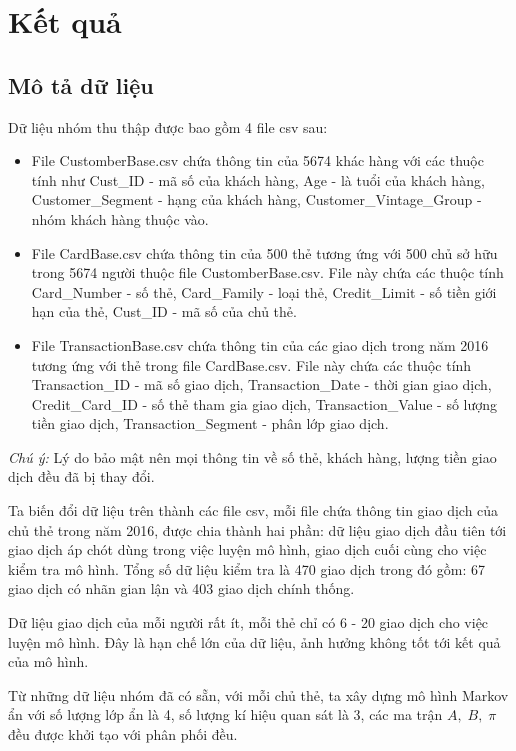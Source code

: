 \setcounter{chapter}{2}
\chapter{Kết quả}
\section{Mô tả dữ liệu}
Dữ liệu nhóm thu thập được bao gồm 4 file csv sau:
\begin{itemize}
	\item File CustomberBase.csv chứa thông tin của 5674 khác hàng với các thuộc tính như Cust\_ID - mã số của khách hàng, Age - là tuổi của khách hàng, Customer\_Segment - hạng của khách hàng, Customer\_Vintage\_Group - nhóm khách hàng thuộc vào.
	\item File CardBase.csv chứa thông tin của 500 thẻ tương ứng với 500 chủ sở hữu trong 5674 người thuộc file CustomberBase.csv. File này chứa các thuộc tính Card\_Number - số thẻ, Card\_Family - loại thẻ, Credit\_Limit - số tiền giới hạn của thẻ, Cust\_ID - mã số của chủ thẻ.
	\item File TransactionBase.csv chứa thông tin của các giao dịch trong năm 2016 tương ứng với thẻ trong file CardBase.csv. File này chứa các thuộc tính Transaction\_ID - mã số giao dịch, Transaction\_Date - thời gian giao dịch, Credit\_Card\_ID - số thẻ tham gia giao dịch, Transaction\_Value - số lượng tiền giao dịch, Transaction\_Segment - phân lớp giao dịch.
\end{itemize}
\textit{Chú ý:} Lý do bảo mật nên mọi thông tin về số thẻ, khách hàng, lượng tiền giao dịch đều đã bị thay đổi.

Ta biến đổi dữ liệu trên thành các file csv, mỗi file chứa thông tin giao dịch của chủ thẻ trong năm 2016, được chia thành hai phần: dữ liệu giao dịch đầu tiên tới giao dịch áp chót dùng trong việc luyện mô hình, giao dịch cuối cùng cho việc kiểm tra mô hình. Tổng số dữ liệu kiểm tra là 470 giao dịch trong đó gồm: 67 giao dịch có nhãn gian lận và 403 giao dịch chính thống.

Dữ liệu giao dịch của mỗi người rất ít, mỗi thẻ chỉ có 6 - 20 giao dịch cho việc luyện mô hình. Đây là hạn chế lớn của dữ liệu, ảnh hưởng không tốt tới kết quả của mô hình.

Từ những dữ liệu nhóm đã có sẵn, với mỗi chủ thẻ, ta xây dựng mô hình Markov ẩn với số lượng lớp ẩn là 4, số lượng kí hiệu quan sát là 3, các ma trận $A,\; B,\; \pi$ đều được khởi tạo với phân phối đều.

